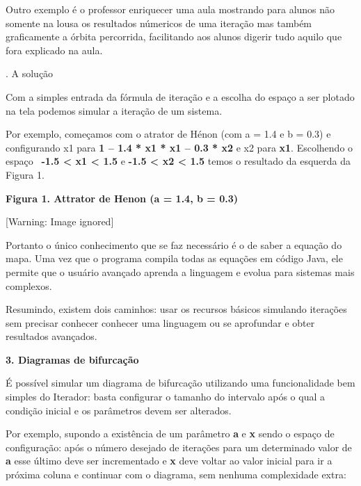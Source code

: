 \documentclass[12pt,twoside]{article}
\begin{document}
{
 Outro exemplo \'e o professor enriquecer uma aula mostrando para alunos
n\~ao somente na lousa os resultados n\'umericos de uma itera\c{c}\~ao
mas tamb\'em graficamente a \'orbita percorrida, facilitando aos alunos
{\textquotedbl}digerir{\textquotedbl} tudo aquilo que fora explicado na
aula.}

{. A solu\c{c}\~ao}

{
Com a simples entrada da f\'ormula de itera\c{c}\~ao e a escolha do
espa\c{c}o a ser plotado na tela podemos simular a itera\c{c}\~ao de um
sistema.}

{
 Por exemplo, come\c{c}amos com o atrator de H\'enon (com a = 1.4 e b =
0.3) e configurando x1 para \textbf{1 {--} 1.4 * x1 * x1 {--} 0.3 * x2}
e x2 para \textbf{x1}\textmd{. Escolhendo o espa\c{c}o
\ }\textbf{{}-1.5 {\textless} x1 {\textless} 1.5 }\textmd{e
}\textbf{{}-1.5 {\textless} x2 {\textless} 1.5 }\textmd{temos o
resultado da esquerda da Figura 1.}}

{\centering{}\sffamily\bfseries
Figura 1. Attrator de Henon (a = 1.4, b = 0.3)
\par}

\begin{center}
 [Warning: Image ignored] %

\end{center}
{\mdseries
 Portanto o \'unico conhecimento que se faz necess\'ario \'e o de saber
a equa\c{c}\~ao do mapa. Uma vez que o programa compila todas as
equa\c{c}\~oes em c\'odigo Java, ele permite que o usu\'ario
avan\c{c}ado aprenda a linguagem e evolua para sistemas mais
complexos.}

{
 Resumindo, existem dois caminhos: usar os recursos b\'asicos simulando
itera\c{c}\~oes sem precisar conhecer conhecer uma linguagem ou se
aprofundar e obter resultados avan\c{c}ados.}

{\bfseries
3. Diagramas de bifurca\c{c}\~ao}

{
 \'E poss\'ivel simular um diagrama de bifurca\c{c}\~ao utilizando uma
funcionalidade bem simples do Iterador: basta configurar o tamanho do
intervalo ap\'os o qual a condi\c{c}\~ao inicial e os par\^ametros
devem ser alterados.}

{
 Por exemplo, supondo a exist\^encia de um par\^ametro \textbf{a} e
\textbf{x} sendo o espa\c{c}o de configura\c{c}\~ao: ap\'os o n\'umero
desejado de itera\c{c}\~oes para um determinado valor de \textbf{a
}esse \'ultimo deve ser incrementado e \textbf{x }\textmd{deve voltar
ao valor inicial para ir a pr\'oxima coluna e continuar com o diagrama,
sem nenhuma complexidade extra}:}
\end{document}
